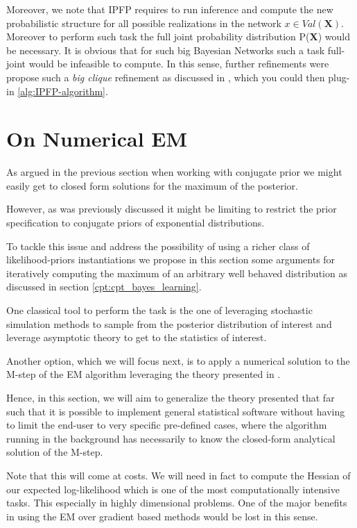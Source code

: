 \documentclass[11pt]{article}
\begin{document}
\begin{article}
Moreover, we note that IPFP requires to run inference and compute
the new probabilistic structure for all possible realizations in
the network \(x \in Val(\textbf{X})\). Moreover to perform such task
the full joint probability distribution P(\textbf{X}) would be
necessary. It is obvious that for such big Bayesian Networks such a
task full-joint would be infeasible to compute. In this sense,
further refinements were propose such a \emph{big clique} refinement as 
discussed in \cite{PENG_2010}, which you could then plug-in
\ref{alg:IPFP-algorithm}.


\section{On Numerical EM}
\label{sec:org6672d51}

As argued in the previous section when working with conjugate prior
we might easily get to closed form solutions for the maximum of the
posterior.

However, as was previously discussed it might be limiting to
restrict the prior specification to conjugate priors of exponential
distributions.

To tackle this issue and address the possibility of using a richer
class of likelihood-priors instantiations we propose in this
section some arguments for iteratively computing the maximum of an
arbitrary well behaved distribution as discussed in section
\ref{cpt:cpt_bayes_learning}.

One classical tool to perform the task is the one of leveraging
stochastic simulation methods to sample from the posterior
distribution of interest and leverage asymptotic theory to get to
the statistics of interest.

Another option, which we will focus next, is to apply a numerical
solution to the M-step of the EM algorithm leveraging the theory
presented in \cite{ruud1989comparison}.

Hence, in this section, we will aim to generalize the theory
presented that far such that it is possible to implement general
statistical software without having to limit the end-user to very
specific pre-defined cases, where the algorithm running in the
background has necessarily to know the closed-form analytical
solution of the M-step.

Note that this will come at costs. We will need in fact to compute
the Hessian of our expected log-likelihood which is one of the most
computationally intensive tasks. This especially in highly
dimensional problems. One of the major benefits in using the EM over
gradient based methods would be lost in this sense.


\end{article}
\end{document}
